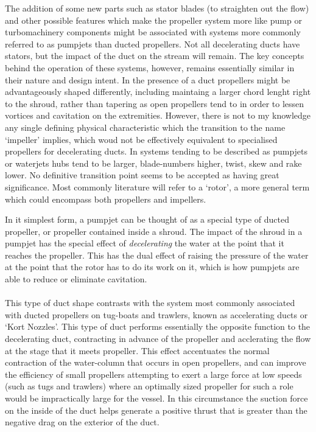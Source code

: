 \documentclass{article}\usepackage[]{graphicx}\usepackage[]{color}
\begin{document}
The addition of some new parts such as stator blades (to straighten out the flow) and other possible features which make the propeller system more like pump or turbomachinery components might be associated with systems more commonly referred to as pumpjets than ducted propellers.  Not all decelerating ducts have stators, but the impact of the duct on the stream will remain. The key concepts behind the operation of these systems, however, remains essentially similar in their nature and design intent.  In the presence of a duct propellers might be advantageously shaped differently, including maintaing a larger chord lenght right to the shroud, rather than tapering as open propellers tend to in order to lessen vortices and cavitation on the extremities.  However, there is not to my knowledge any single defining physical characteristic which the transition to the name `impeller' implies, which woud not be effectively equivalent to specialised propellers for decelerating ducts.  In systems tending to be described as pumpjets or waterjets hubs tend to be larger, blade-numbers higher, twist, skew and rake lower.  No definitive transition point seems to be accepted as having great significance.  Most commonly literature will refer to a `rotor', a more general term which could encompass both propellers and impellers.

\begin{tcolorbox}[width=0.8\textwidth, center, colback=blue!5!white,colframe=blue!75!black, title= The difference between a pumpjet and a propeller]
In it simplest form, a pumpjet can be thought of as a special type of ducted propeller, or propeller contained inside a shroud.  The impact of the shroud in a pumpjet has the special effect of \textit{decelerating} the water at the point that it reaches the propeller.  This has the dual effect of raising the pressure of the water at the point that the rotor has to do its work on it, which is how pumpjets are able to reduce or eliminate cavitation.
\\
\\
This type of duct shape contrasts with the system most commonly associated with ducted propellers on tug-boats and trawlers, known as accelerating ducts or `Kort Nozzles'.  This type of duct performs essentially the opposite function to the decelerating duct, contracting in advance of the propeller and acclerating the flow at the stage that it meets propeller.  This effect accentuates the normal contraction of the water-column that occurs in open propellers, and can improve the efficiency of small propellers attempting to exert a large force at low speeds (such as tugs and trawlers) where an optimally sized propeller for such a role would be impractically large for the vessel.  In this circumstance the suction force on the inside of the duct helps generate a positive thrust that is greater than the negative drag on the exterior of the duct.
\end{tcolorbox}
\end{document}

